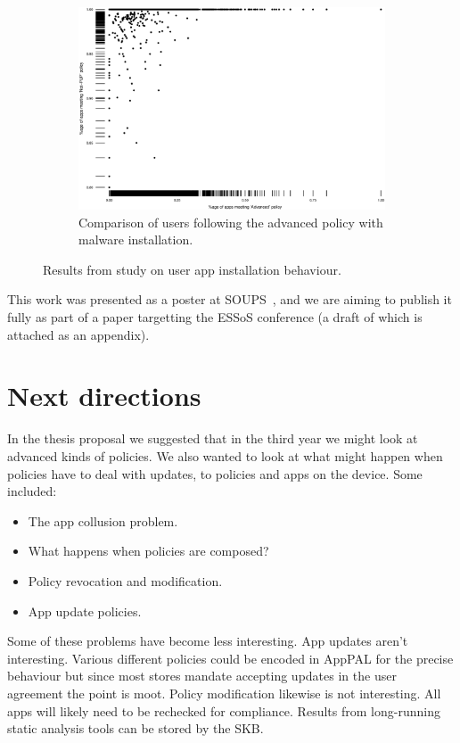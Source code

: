 \documentclass[a4paper]{scrartcl}
\begin{document}
\begin{figure}
  \begin{subfigure}[b]{\linewidth}
    \includegraphics[width=\linewidth]{./images/compare-2yr.eps}
    \caption{Comparison of users following the advanced policy with malware installation.}
    \label{sfig:compare}
  \end{subfigure}

  \caption{Results from study on user app installation behaviour.}
  \label{fig:lin}
\end{figure}

This work was presented as a poster at SOUPS~\citep{Hallett:2015ty}, and we are aiming to publish it fully as part of a paper targetting the ESSoS conference (a draft of which is attached as an appendix).

\section{Next directions}

In the thesis proposal we suggested that in the third year we might look at advanced kinds of policies.
We also wanted to look at what might happen when policies have to deal with updates, to policies and apps on the device.
Some included:
\begin{itemize}
  \item The app collusion problem.
  \item What happens when policies are composed?
  \item Policy revocation and modification.
  \item App update policies.
\end{itemize}

Some of these problems have become less interesting.
App updates aren't interesting. Various different policies could be encoded in AppPAL for the precise behaviour but since most stores mandate accepting updates in the user agreement the point is moot.
Policy modification likewise is not interesting.  All apps will likely need to be rechecked for compliance.  Results from long-running static analysis tools can be stored by the \ac{SKB}.
\end{document}
